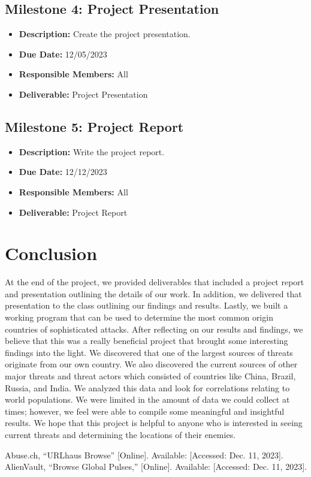 \documentclass[letterpaper, 10 pt, conference]{ieeeconf}  %
\begin{document}
    \subsection*{Milestone 4: Project Presentation}
    \begin{itemize}
        \item \textbf{Description:} Create the project presentation.
        \item \textbf{Due Date:} 12/05/2023
        \item \textbf{Responsible Members:} All
        \item \textbf{Deliverable:} Project Presentation
    \end{itemize}
    \subsection*{Milestone 5: Project Report}
    \begin{itemize}
        \item \textbf{Description:} Write the project report.
        \item \textbf{Due Date:} 12/12/2023
        \item \textbf{Responsible Members:} All
        \item \textbf{Deliverable:} Project Report
    \end{itemize}

    


\section{Conclusion}

At the end of the project, we provided deliverables that included a project report and presentation outlining the details of our work. 
In addition, we delivered that presentation to the class outlining our findings and results. Lastly, we built a working program that can be used to determine the most common origin countries of sophisticated attacks. After reflecting on our results and findings, we believe that this was a really beneficial project that brought some interesting findings into the light. We discovered that one of the largest sources of threats originate from our own country. We also discovered the current sources of other major threats and threat actors which consisted of countries like China, Brazil, Russia, and India. We analyzed this data and look for correlations relating to world populations. We were limited in the amount of data we could collect at times; however, we feel were able to compile some meaningful and insightful results. We hope that this project is helpful to anyone who is interested in seeing current threats and determining the locations of their enemies.   


\begin{thebibliography}{1}

Abuse.ch, ``URLhaus Browse'' [Online]. Available: \href{https://urlhaus.abuse.ch/browse/}{} [Accessed: Dec. 11, 2023].
AlienVault, ``Browse Global Pulses,'' [Online]. Available: \href{https://otx.alienvault.com/browse/global/pulses}{}
[Accessed: Dec. 11, 2023].

\end{thebibliography}
\end{document}
